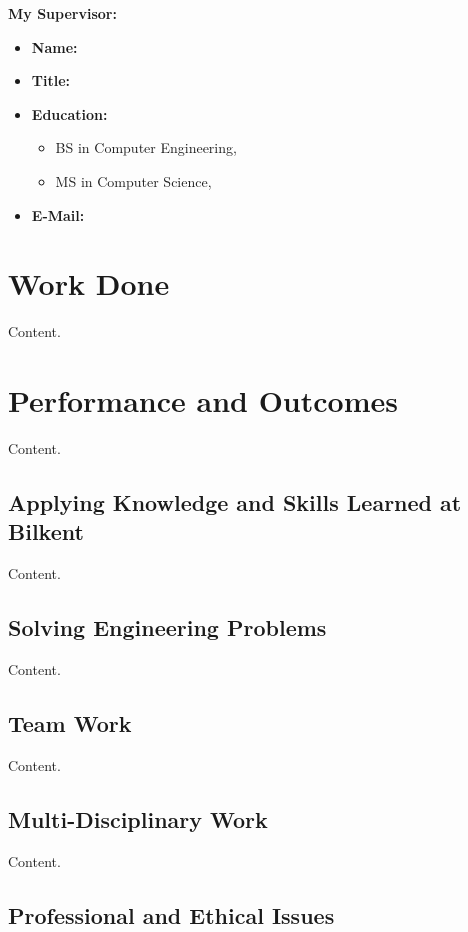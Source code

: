 \documentclass[10pt]{article}
\begin{document}
\textbf{My Supervisor:}
\begin{itemize}
    \item{\textbf{Name: } }
    \item{\textbf{Title: } }
    \item{\textbf{Education:} }
    \begin{itemize}
        \item{BS in Computer Engineering, }
        \item{MS in Computer Science, }
    \end{itemize}
    \item{\textbf{E-Mail: } }
\end{itemize}

\section{Work Done}

Content.

\section{Performance and Outcomes}

Content.

\subsection{Applying Knowledge and Skills Learned at Bilkent}

Content.

\subsection{Solving Engineering Problems}

Content.

\subsection{Team Work}

Content.

\subsection{Multi-Disciplinary Work}

Content.

\subsection{Professional and Ethical Issues}
\end{document}

